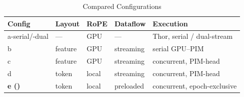 \begin{table}[!t]
\caption{Compared Configurations}
\label{tab:configs}
\centering
\footnotesize
\setlength{\tabcolsep}{3pt}
\begin{tabular}{@{}lllll@{}}
\toprule
\textbf{Config} & \textbf{Layout} & \textbf{RoPE} & \textbf{Dataflow} & \textbf{Execution} \\
\midrule
a-serial/-dual & --- & GPU & --- & Thor, serial / dual-stream \\
b & feature & GPU & streaming & serial GPU--PIM \\
c & feature & GPU & streaming & concurrent, PIM-head \\
d & token & local & streaming & concurrent, PIM-head \\
\textbf{e (\sys{})} & token & local & preloaded & concurrent, epoch-exclusive \\
\bottomrule
\end{tabular}
\end{table}
